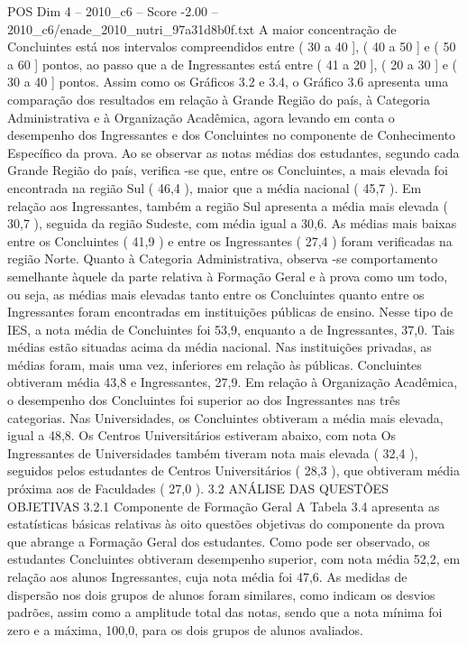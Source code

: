 \begin{textsample}{POS Dim 4 – 2010\_c6 – Score -2.00 – 2010\_c6/enade\_2010\_nutri\_97a31d8b0f.txt}
A maior concentração de Concluintes está nos intervalos compreendidos entre ( 30 a 40 ], ( 40 a 50 ] e ( 50 a 60 ] pontos, ao passo que a de Ingressantes está entre ( 41 a 20 ], ( 20 a 30 ] e ( 30 a 40 ] pontos.
Assim como os Gráficos 3.2 e 3.4, o Gráfico 3.6 apresenta uma comparação dos resultados em relação à Grande Região do país, à Categoria Administrativa e à Organização Acadêmica, agora levando em conta o desempenho dos Ingressantes e dos Concluintes no componente de Conhecimento Específico da prova.
Ao se observar as notas médias dos estudantes, segundo cada Grande Região do país, verifica -se que, entre os Concluintes, a mais elevada foi encontrada na região Sul ( 46,4 ), maior que a média nacional ( 45,7 ).
Em relação aos Ingressantes, também a região Sul apresenta a média mais elevada ( 30,7 ), seguida da região Sudeste, com média igual a 30,6.
As médias mais baixas entre os Concluintes ( 41,9 ) e entre os Ingressantes ( 27,4 ) foram verificadas na região Norte.
Quanto à Categoria Administrativa, observa -se comportamento semelhante àquele da parte relativa à Formação Geral e à prova como um todo, ou seja, as médias mais elevadas tanto entre os Concluintes quanto entre os Ingressantes foram encontradas em instituições públicas de ensino.
Nesse tipo de IES, a nota média de Concluintes foi 53,9, enquanto a de Ingressantes, 37,0.
Tais médias estão situadas acima da média nacional.
Nas instituições privadas, as médias foram, mais uma vez, inferiores em relação às públicas.
Concluintes obtiveram média 43,8 e Ingressantes, 27,9.
Em relação à Organização Acadêmica, o desempenho dos Concluintes foi superior ao dos Ingressantes nas três categorias.
Nas Universidades, os Concluintes obtiveram a média mais elevada, igual a 48,8.
Os Centros Universitários estiveram abaixo, com nota Os Ingressantes de Universidades também tiveram nota mais elevada ( 32,4 ), seguidos pelos estudantes de Centros Universitários ( 28,3 ), que obtiveram média próxima aos de Faculdades ( 27,0 ). 3.2 ANÁLISE DAS QUESTÕES OBJETIVAS 3.2.1 Componente de Formação Geral A Tabela 3.4 apresenta as estatísticas básicas relativas às oito questões objetivas do componente da prova que abrange a Formação Geral dos estudantes.
Como pode ser observado, os estudantes Concluintes obtiveram desempenho superior, com nota média 52,2, em relação aos alunos Ingressantes, cuja nota média foi 47,6.
As medidas de dispersão nos dois grupos de alunos foram similares, como indicam os desvios padrões, assim como a amplitude total das notas, sendo que a nota mínima foi zero e a máxima, 100,0, para os dois grupos de alunos avaliados.

\end{textsample}

